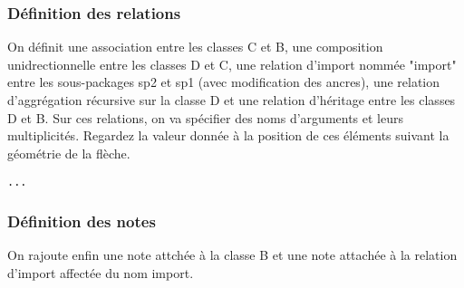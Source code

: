 \documentclass[a4paper,11pt]{report}
\newcommand{\inputTikZ}[1]{%
  }%
\newcommand{\inputTikZ}[1]{%
    \texttt{[image: fig/\#1.pdf]}%
  }%
\begin{document}
\vspace{-0.4cm}
{\color{red!70!black}
\vspace{-0.4cm}
}
\vspace{-0.4cm}
{\color{red!70!black}
\vspace{-0.4cm}
}
\vspace{-0.4cm}
{\color{red!70!black}
\vspace{-0.4cm}
}


\begin{center}
\inputTikZ{figure33}
\end{center}


\subsubsection{Définition des relations}

On définit une association entre les classes C et B, une composition unidrectionnelle entre les classes D et C, une relation d'import nommée "import" entre les sous-packages sp2 et sp1 (avec modification des ancres), une relation d'aggrégation récursive sur la classe D et une relation d'héritage entre les classes D et B. Sur ces relations, on va spécifier des noms d'arguments et leurs multiplicités. Regardez la valeur donnée à la position de ces éléments suivant la géométrie de la flèche.

\medskip

\hspace{-0.7cm}\lstinline{...}
{\color{red!70!black}

}

\begin{center}
\inputTikZ{figure34}
\end{center}

\subsubsection{Définition des notes}

On rajoute enfin une note attchée à la classe B et une note attachée à la relation d'import affectée du nom import.
\end{document}
